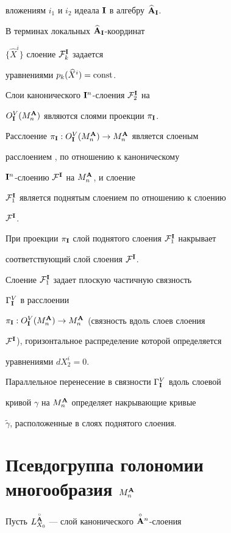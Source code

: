 вложениям $i_1$ и $i_2$ идеала ${\bold I}$ в алгебру $\widehat{{\bold A}}_{\bold I}$.


В терминах локальных $\widehat{{\bold A}}_{\bold I}$-координат


$\{\widehat X^i\}$ слоение ${\cal F}^{\bold I}_k$ задается


уравнениями $p_k(\widehat X^i)= \operatorname{const}$.


Слои канонического ${\bold I}^n$-слоения ${\cal F}^{\bold I}_2$ на


$O^V_{{\bold I}}(M^{\bold A}_n)$ являются слоями проекции $\pi_{{\bold I}}$.


Расслоение $\pi_{{\bold I}}:O^V_{{\bold I}}(M^{\bold A}_n)\to M^{\bold A}_n$ является слоеным


расслоением \cite{Mol}, \cite{Kam-T} по отношению к каноническому


${\bold I}^n$-слоению ${\cal F}^{\bold I}$ на $M^{\bold A}_n$, и слоение


${\cal F}^{\bold I}_1$ является поднятым слоением по отношению к слоению


${\cal F}^{\bold I}$.


При проекции $\pi_{\bold I}$ слой поднятого слоения ${\cal F}^{\bold I}_1$ накрывает


соответствующий слой слоения ${\cal F}^{\bold I}$.


Слоение ${\cal F}^{\bold I}_1$ задает плоскую частичную связность \cite{Kam-T}


$\Gamma^V_{\bold I}$ в расслоении


$\pi_{{\bold I}}:O^V_{{\bold I}}(M^{\bold A}_n)\to M^{\bold A}_n$ (связность вдоль слоев слоения


${\cal F}^{\bold I}$), горизонтальное распределение которой определяется


уравнениями $dX^i_2=0$.


Параллельное перенесение в связности $\Gamma^V_{\bold I}$ вдоль слоевой


кривой $\gamma$ на $M^{\bold A}_n$ определяет накрывающие кривые


$\widetilde\gamma$, расположенные в слоях поднятого слоения.


 





\section{Псевдогруппа голономии многообразия $M^{\bold A}_n$}





 


Пусть $L^{\overset{\circ}{\bold A}{}}_{X_0}$ --- слой канонического $\overset{\circ}{{\bold A}}{}^n$-слоения


